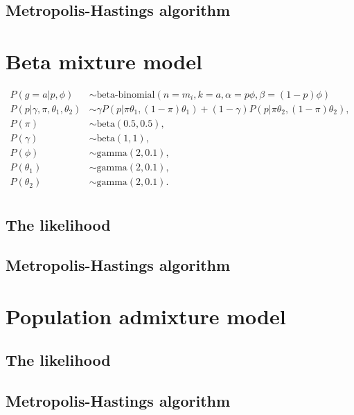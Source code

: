 \documentclass[11pt,english,letterpaper,oneside]{article}
\begin{document}
\subsection{Metropolis-Hastings algorithm}

\section{Beta mixture model}

\begin{align*}
P(g=a|p,\phi) &\sim \text{beta-binomial}(n=m_i, k = a, \alpha = p\phi, \beta = (1-p)\phi) \\
P(p|\gamma, \pi, \theta_1, \theta_2) &\sim \gamma P(p|\pi\theta_1, (1-\pi)\theta_1) + (1-\gamma)P(p|\pi\theta_2, (1-\pi)\theta_2), \\
P(\pi) &\sim \text{beta}(0.5, 0.5), \\
P(\gamma) &\sim \text{beta}(1,1), \\
P(\phi) &\sim \text{gamma}(2,0.1), \\
P(\theta_1) &\sim \text{gamma}(2,0.1), \\
P(\theta_2) &\sim \text{gamma}(2,0.1). \\
\end{align*}

\subsection{The likelihood}

\subsection{Metropolis-Hastings algorithm}

\section{Population admixture model}

\subsection{The likelihood}

\subsection{Metropolis-Hastings algorithm}
\end{document}
